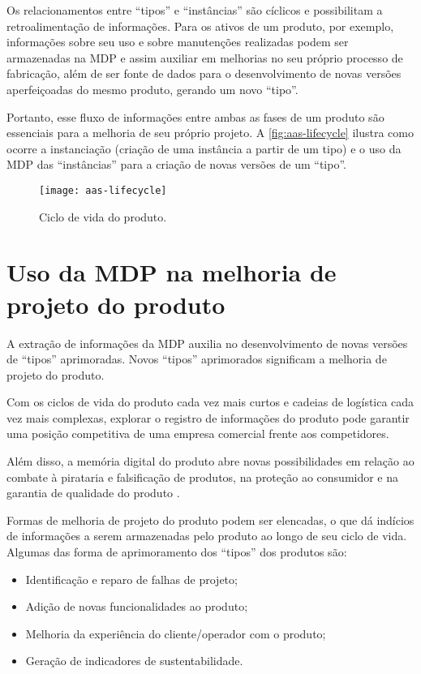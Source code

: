 	Os relacionamentos entre ``tipos'' e ``instâncias'' são cíclicos e possibilitam a retroalimentação de informações. Para os ativos de um produto, por exemplo, informações sobre seu uso e sobre manutenções realizadas podem ser armazenadas na MDP e assim auxiliar em melhorias no seu próprio processo de fabricação, além de ser fonte de dados para o desenvolvimento de novas versões aperfeiçoadas do mesmo produto, gerando um novo ``tipo''.
	
	Portanto, esse fluxo de informações entre ambas as fases de um produto são essenciais para a melhoria de seu próprio projeto. A \autoref{fig:aas-lifecycle} ilustra como ocorre a instanciação (criação de uma instância a partir de um tipo) e o uso da MDP das ``instâncias'' para a criação de novas versões de um ``tipo''.
	
	\begin{figure}[htb!]
		\centering
		\caption{Ciclo de vida do produto.}
		\label{fig:aas-lifecycle}
		\texttt{[image: aas-lifecycle]}
	\end{figure}

\section{Uso da MDP na melhoria de projeto do produto}

	A extração de informações da MDP auxilia no desenvolvimento de novas versões de ``tipos'' aprimoradas. Novos ``tipos'' aprimorados significam a melhoria de projeto do produto.

	Com os ciclos de vida do produto cada vez mais curtos e cadeias de logística cada vez mais complexas, explorar o registro de informações do produto pode garantir uma posição competitiva de uma empresa comercial frente aos competidores.
	
	Além disso, a memória digital do produto abre novas possibilidades em relação ao combate à pirataria e falsificação de produtos, na proteção ao consumidor e na garantia de qualidade do produto \cite{wahlster2007digitalmemory}.
	
	Formas de melhoria de projeto do produto podem ser elencadas, o que dá indícios de informações a serem armazenadas pelo produto ao longo de seu ciclo de vida. Algumas das forma de aprimoramento dos ``tipos'' dos produtos são:
	
	\begin{itemize}
		\item Identificação e reparo de falhas de projeto;
		\item Adição de novas funcionalidades ao produto;
		\item Melhoria da experiência do cliente/operador com o produto;
		\item Geração de indicadores de sustentabilidade.
	\end{itemize}

